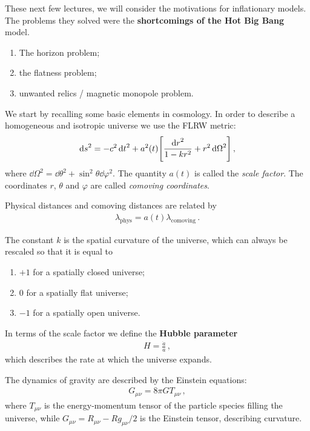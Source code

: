 \documentclass[main.tex]{subfiles}
\begin{document}

These next few lectures, we will consider the motivations for inflationary models. 
The problems they solved were the \textbf{shortcomings of the Hot Big Bang} model. 

\begin{enumerate}
    \item The horizon problem;
    \item the flatness problem;
    \item unwanted relics / magnetic monopole problem.
\end{enumerate}

We start by recalling some basic elements in cosmology. 
In order to describe a homogeneous and isotropic universe we use the FLRW metric: 
%
\begin{align}
\dd{s}^2  = - c^2 \dd{t}^2 + a^2(t) \qty[ \frac{ \dd{r}^2}{1 - k r^2} + r^2 \dd{\Omega}^2]
\,,
\end{align}
%
where \(\dd{\Omega}^2 = \dd{\theta}^2 + \sin^2 \theta \dd{\varphi }^2
\). The quantity \(a(t)\) is called the \emph{scale factor}.
The coordinates \(r\), \(\theta \) and \(\varphi \) are called \emph{comoving coordinates}. 

Physical distances and comoving distances are related by 
%
\begin{align}
\lambda _{\text{phys}} = a(t) \lambda _{\text{comoving}}
\,.
\end{align}

The constant  \(k\) is the spatial curvature of the universe, which can always be rescaled so that it is equal to 
\begin{enumerate}
    \item \(+1\) for a spatially closed universe;
    \item \(0\) for a spatially flat universe;
    \item \(-1\) for a spatially open universe.
\end{enumerate}

In terms of the scale factor we define the \textbf{Hubble parameter} 
%
\begin{align}
H = \frac{\dot{a}}{a}
\,,
\end{align}
%
which describes the rate at which the universe expands. 

The dynamics of gravity are described by the Einstein equations: 
%
\begin{align}
G_{\mu \nu } = 8 \pi G T_{\mu \nu }
\,,
\end{align}
%
where \(T_{\mu \nu }\) is the energy-momentum tensor of the particle species filling the universe, while \(G_{\mu \nu } = R_{\mu \nu } - R g_{\mu \nu } / 2\) is the Einstein tensor, describing curvature. 
\end{document}
